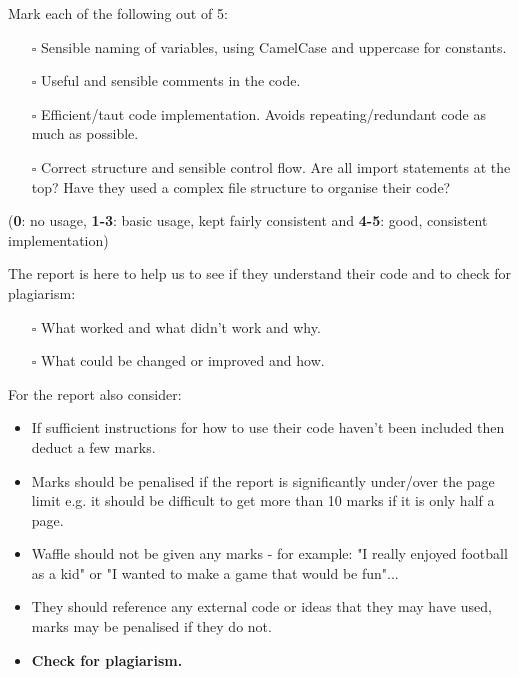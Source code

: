 \documentclass[11pt]{report}
\begin{document}
\begin{Exercise}[title= General Implementation (20 marks)]

Mark each of the following out of 5:
    \begin{itemize}
        \item[$\square$] Sensible naming of variables, using CamelCase and uppercase for constants.
        \item[$\square$] Useful and sensible comments in the code.
        \item[$\square$] Efficient/taut code implementation. Avoids repeating/redundant code as much as possible.
        \item[$\square$] Correct structure and sensible control flow. Are all import statements at the top? Have they used a complex file structure to organise their code?
    \end{itemize}

(\textbf{0}: no usage, \textbf{1-3}: basic usage, kept fairly consistent and \textbf{4-5}: good, consistent implementation)
\end{Exercise}

\begin{Exercise}[title=Report (20 marks)]
The report is here to help us to see if they understand their code and to check for plagiarism: 
    \begin{itemize}
	    \item[$\square$] What worked and what didn't work and why.
	    \item[$\square$] What could be changed or improved and how.
    \end{itemize}
\end{Exercise}
    
For the report also consider:
\begin{itemize}
    \item If sufficient instructions for how to use their code haven't been included then deduct a few marks.
    \item Marks should be penalised if the report is significantly under/over the page limit e.g. it should be difficult to get more than 10 marks if it is only half a page.
    \item Waffle should not be given any marks - for example: "I really enjoyed football as a kid" or "I wanted to make a game that would be fun"...
    \item They should reference any external code or ideas that they may have used, marks may be penalised if they do not.
    \item \textbf{Check for plagiarism.}
\end{itemize}
\end{document}

